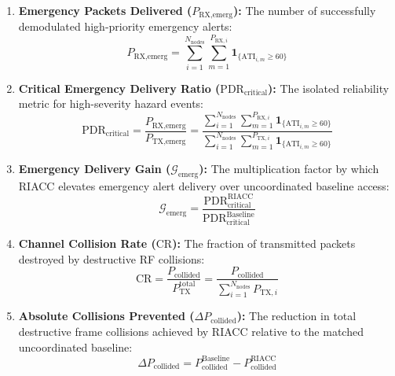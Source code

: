 \documentclass[preprint,review,12pt]{elsarticle}
\begin{document}
\begin{enumerate}
    \item \textbf{Emergency Packets Delivered ($P_{\text{RX}, \text{emerg}}$):} The number of successfully demodulated high-priority emergency alerts:
    \begin{equation}
        P_{\text{RX}, \text{emerg}} = \sum_{i=1}^{N_{\text{nodes}}} \sum_{m=1}^{P_{\text{RX}, i}} \mathbf{1}_{\{\text{ATI}_{i,m} \ge 60\}}
        \label{eq:prx_emerg}
    \end{equation}

    \item \textbf{Critical Emergency Delivery Ratio ($\text{PDR}_{\text{critical}}$):} The isolated reliability metric for high-severity hazard events:
    \begin{equation}
        \text{PDR}_{\text{critical}} = \frac{P_{\text{RX}, \text{emerg}}}{P_{\text{TX}, \text{emerg}}} = \frac{ \sum_{i=1}^{N_{\text{nodes}}} \sum_{m=1}^{P_{\text{RX}, i}} \mathbf{1}_{\{\text{ATI}_{i,m} \ge 60\}} }{ \sum_{i=1}^{N_{\text{nodes}}} \sum_{m=1}^{P_{\text{TX}, i}} \mathbf{1}_{\{\text{ATI}_{i,m} \ge 60\}} }
        \label{eq:eval_pdr_critical}
    \end{equation}

    \item \textbf{Emergency Delivery Gain ($\mathcal{G}_{\text{emerg}}$):} The multiplication factor by which RIACC elevates emergency alert delivery over uncoordinated baseline access:
    \begin{equation}
        \mathcal{G}_{\text{emerg}} = \frac{\text{PDR}_{\text{critical}}^{\text{RIACC}}}{\text{PDR}_{\text{critical}}^{\text{Baseline}}}
        \label{eq:emerg_gain}
    \end{equation}

    \item \textbf{Channel Collision Rate ($\text{CR}$):} The fraction of transmitted packets destroyed by destructive RF collisions:
    \begin{equation}
        \text{CR} = \frac{ P_{\text{collided}} }{ P_{\text{TX}}^{\text{total}} } = \frac{ P_{\text{collided}} }{ \sum_{i=1}^{N_{\text{nodes}}} P_{\text{TX}, i} }
        \label{eq:cr}
    \end{equation}

    \item \textbf{Absolute Collisions Prevented ($\Delta P_{\text{collided}}$):} The reduction in total destructive frame collisions achieved by RIACC relative to the matched uncoordinated baseline:
    \begin{equation}
        \Delta P_{\text{collided}} = P_{\text{collided}}^{\text{Baseline}} - P_{\text{collided}}^{\text{RIACC}}
        \label{eq:collisions_prevented}
    \end{equation}


\end{enumerate}
\end{document}
